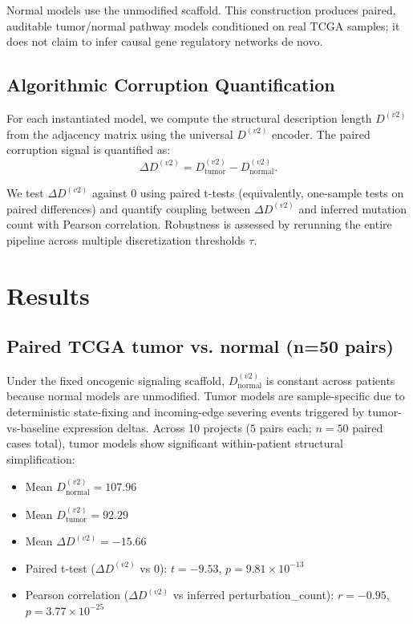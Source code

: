 \documentclass[11pt]{article}
\begin{document}
Normal models use the unmodified scaffold. This construction produces paired, auditable tumor/normal pathway models conditioned on real TCGA samples; it does not claim to infer causal gene regulatory networks de novo.

\subsection*{Algorithmic Corruption Quantification}

For each instantiated model, we compute the structural description length $D^{(v2)}$ from the adjacency matrix using the universal $D^{(v2)}$ encoder. The paired corruption signal is quantified as:
\begin{equation}
\Delta D^{(v2)} = D^{(v2)}_{\mathrm{tumor}} - D^{(v2)}_{\mathrm{normal}}.
\end{equation}

We test $\Delta D^{(v2)}$ against 0 using paired t-tests (equivalently, one-sample tests on paired differences) and quantify coupling between $\Delta D^{(v2)}$ and inferred mutation count with Pearson correlation. Robustness is assessed by rerunning the entire pipeline across multiple discretization thresholds $\tau$.

\section*{Results}

\subsection*{Paired TCGA tumor vs. normal (n=50 pairs)}

Under the fixed oncogenic signaling scaffold, $D^{(v2)}_{\mathrm{normal}}$ is constant across patients because normal models are unmodified. Tumor models are sample-specific due to deterministic state-fixing and incoming-edge severing events triggered by tumor-vs-baseline expression deltas. Across 10 projects ($5$ pairs each; $n=50$ paired cases total), tumor models show significant within-patient structural simplification:
\begin{itemize}
    \item Mean $D^{(v2)}_{\mathrm{normal}} = 107.96$
    \item Mean $D^{(v2)}_{\mathrm{tumor}} = 92.29$
    \item Mean $\Delta D^{(v2)} = -15.66$
    \item Paired t-test ($\Delta D^{(v2)}$ vs 0): $t=-9.53$, $p=9.81\times 10^{-13}$
    \item Pearson correlation ($\Delta D^{(v2)}$ vs inferred perturbation\_count): $r=-0.95$, $p=3.77\times 10^{-25}$
\end{itemize}
\end{document}

